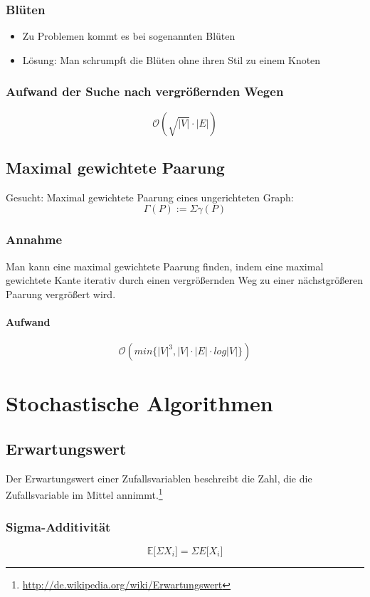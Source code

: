 \subsubsection{Blüten}
\begin{itemize}
	\item Zu Problemen kommt es bei sogenannten Blüten
	\item Lösung: Man schrumpft die Blüten ohne ihren Stil zu einem Knoten
\end{itemize}

\subsubsection{Aufwand der Suche nach vergrößernden Wegen}
\[\mathcal{O}(\sqrt{|V|} \cdot |E|)\]


\subsection{Maximal gewichtete Paarung}
Gesucht: Maximal gewichtete Paarung eines ungerichteten Graph:
\[\Gamma(P) := \Sigma \gamma (P)\]

\subsubsection{Annahme}
Man kann eine maximal gewichtete Paarung finden, indem eine maximal gewichtete Kante iterativ durch einen vergrößernden Weg zu einer nächstgrößeren Paarung vergrößert wird.

\paragraph{Aufwand}
\[\mathcal{O}(min\{|V|^3, |V| \cdot |E| \cdot log|V|\})\]



\section{Stochastische Algorithmen}

\subsection{Erwartungswert}
Der Erwartungswert einer Zufallsvariablen beschreibt die Zahl, die die Zufallsvariable im Mittel annimmt.\footnote{\url{http://de.wikipedia.org/wiki/Erwartungswert}}

\subsubsection{Sigma-Additivität}
\[\mathbb{E}\lbrack \Sigma X_i\rbrack = \Sigma E \lbrack X_i\rbrack\]


